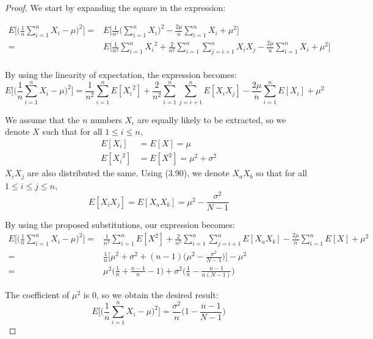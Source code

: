 \vspace{1em}

\begin{proof}
    We start by expanding the square in the expression:

    \begin{align*}
        E\bigg[\bigg(\frac{1}{n}\sum_{i = 1}^n X_i - \mu\bigg)^2\bigg]
        =& E\bigg[\frac{1}{n^2}\bigg(\sum_{i = 1}^n X_i\bigg)^2 
                              - \frac{2\mu}{n}\sum_{i = 1}^n X_i + \mu^2\bigg] \\
        =& E\bigg[\frac{1}{n^2}\sum_{i = 1}^{n} {X_i}^2 + \frac{2}{n^2}\sum_{i = 1}^n\sum_{j = i + 1}^n X_iX_j
                              - \frac{2\mu}{n}\sum_{i = 1}^n X_i + \mu^2\bigg] \\
    \end{align*}

    By using the linearity of expectation, the expression becomes:
    \[
        E\bigg[\bigg(\frac{1}{n}\sum_{i = 1}^n X_i - \mu\bigg)^2\bigg] =
        \frac{1}{n^2}\sum_{i = 1}^nE[{X_i}^2] + \frac{2}{n^2}\sum_{i = 1}^n\sum_{j = i + 1}^n E[X_iX_j]
        - \frac{2\mu}{n} \sum_{i = 1}^n E[X_i] + \mu^2
    \] 

    We assume that the $n$ numbers $X_i$ are equally likely to be extracted, so
    we denote $X$ such that for all $1 \leq i \leq n$,
    \begin{align*}
        E[X_i] &= E[X] = \mu \\
        E[{X_i}^2] &= E[X^2] = \mu^2 + \sigma^2
    \end{align*}
    $X_iX_j$ are also distributed the same. Using (3.90), we denote $X_aX_b$ so that 
    for all $1 \leq i \leq j \leq n$,
    \[
        E[X_iX_j] = E[X_aX_b] = \mu^2 - \frac{\sigma^2}{N - 1}
    \] 

    By using the proposed substitutions, our expression becomes:
    \begin{align*}
        E\bigg[\bigg(\frac{1}{n}\sum_{i = 1}^n X_i - \mu\bigg)^2\bigg]
        =& \frac{1}{n^2}\sum_{i = 1}^nE[{X}^2] + \frac{2}{n^2}\sum_{i = 1}^n\sum_{j = i + 1}^n E[X_aX_b]
            - \frac{2\mu}{n} \sum_{i = 1}^n E[X] + \mu^2 \\
        =& \frac{1}{n}\bigg[\mu^2 + \sigma^2 + (n - 1) 
            \bigg(\mu^2 - \frac{\sigma^2}{N - 1}\bigg)\bigg] - \mu^2 \\
        =& \mu^2 \bigg(\frac{1}{n} + \frac{n-1}{n} - 1\bigg) + 
            \sigma^2\bigg(\frac{1}{n} - \frac{n-1}{n(N - 1)}\bigg) 
    \end{align*}

    The coefficient of $\mu^2$ is 0, so we obtain the desired result:
    \begin{equation*}\tag{3.91}
        E\bigg[\bigg(\frac{1}{n}\sum_{i = 1}^n X_i - \mu\bigg)^2\bigg] 
        = \frac{\sigma^2}{n}\bigg(1 - \frac{n-1}{N-1}\bigg)
    \end{equation*}
\end{proof}



